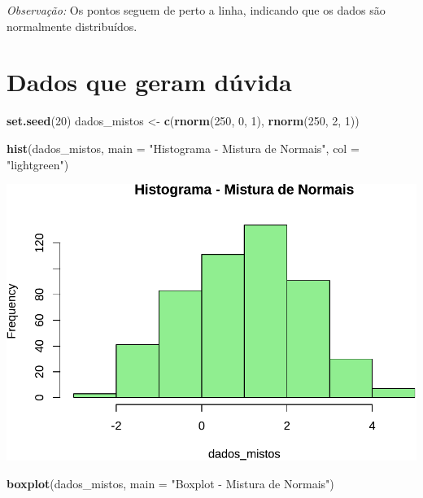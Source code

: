 \documentclass[
]{book}
\newenvironment{Shaded}{\begin{snugshade}}{\end{snugshade}}
\newcommand{\AttributeTok}[1]{\textcolor[rgb]{0.13,0.29,0.53}{#1}}
\newcommand{\DecValTok}[1]{\textcolor[rgb]{0.00,0.00,0.81}{#1}}
\newcommand{\FunctionTok}[1]{\textcolor[rgb]{0.13,0.29,0.53}{\textbf{#1}}}
\newcommand{\NormalTok}[1]{#1}
\newcommand{\OtherTok}[1]{\textcolor[rgb]{0.56,0.35,0.01}{#1}}
\newcommand{\StringTok}[1]{\textcolor[rgb]{0.31,0.60,0.02}{#1}}
\begin{document}
\emph{Observação:} Os pontos seguem de perto a linha, indicando que os dados são normalmente distribuídos.

\section{Dados que geram dúvida}\label{dados-que-geram-duxfavida}

\begin{Shaded}
\begin{Highlighting}[]
\FunctionTok{set.seed}\NormalTok{(}\DecValTok{20}\NormalTok{)}
\NormalTok{dados\_mistos }\OtherTok{\textless{}{-}} \FunctionTok{c}\NormalTok{(}\FunctionTok{rnorm}\NormalTok{(}\DecValTok{250}\NormalTok{, }\DecValTok{0}\NormalTok{, }\DecValTok{1}\NormalTok{), }\FunctionTok{rnorm}\NormalTok{(}\DecValTok{250}\NormalTok{, }\DecValTok{2}\NormalTok{, }\DecValTok{1}\NormalTok{))}

\FunctionTok{hist}\NormalTok{(dados\_mistos, }\AttributeTok{main =} \StringTok{"Histograma {-} Mistura de Normais"}\NormalTok{, }\AttributeTok{col =} \StringTok{"lightgreen"}\NormalTok{)}
\end{Highlighting}
\end{Shaded}

\includegraphics{Livro-Estatistica+R_files/figure-latex/duvidosa-1.pdf}

\begin{Shaded}
\begin{Highlighting}[]
\FunctionTok{boxplot}\NormalTok{(dados\_mistos, }\AttributeTok{main =} \StringTok{"Boxplot {-} Mistura de Normais"}\NormalTok{)}
\end{Highlighting}
\end{Shaded}
\end{document}
